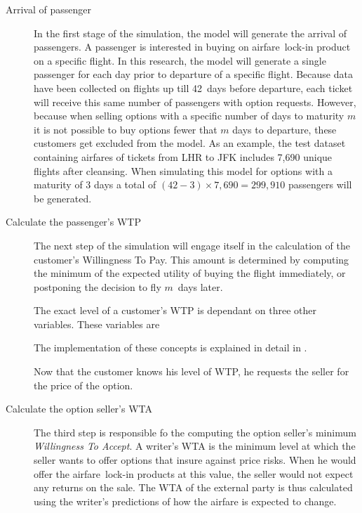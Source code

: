 \begin{description}
\item[Arrival of passenger] In the first stage of the simulation, the model will generate the arrival of passengers. A passenger is interested in buying on airfare~lock-in product on a specific flight. In this research, the model will generate a single passenger for each day prior to departure of a specific flight. Because data have been collected on flights up till 42~days before departure, each ticket will receive this same number of passengers with option requests. However, because when selling options with a specific number of days to maturity $m$ it is not possible to buy options fewer that $m$ days to departure, these customers get excluded from the model. As an example, the test dataset containing airfares of tickets from LHR to JFK includes 7,690 unique flights after cleansing. When simulating this model for options with a maturity of 3 days a total of $(42 - 3) \times 7,690 = 299,910$ passengers will be generated.

\item[Calculate the passenger's WTP] The next step of the simulation will engage itself in the calculation of the customer's Willingness To Pay. This amount is determined by computing the minimum of the expected utility of buying the flight immediately, or postponing the decision to fly $m$~days later.

The exact level of a customer's WTP is dependant on three other variables. These variables are  The implementation of these concepts is explained in detail in .

Now that the customer knows his level of WTP, he requests the seller for the price of the option.

\item[Calculate the option seller's WTA] The third step is responsible fo the computing the option seller's minimum \emph{Willingness To Accept}. A writer's WTA is the minimum level at which the seller wants to offer options that insure against price risks. When he would offer the airfare~lock-in products at this value, the seller would not expect any returns on the sale. The WTA of the external party is thus calculated using the writer's predictions of how the airfare is expected to change.


\end{description}
